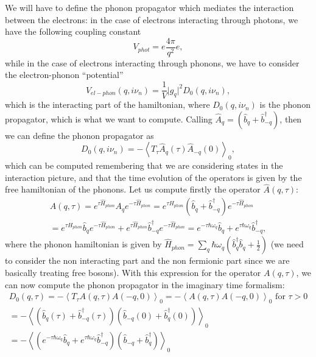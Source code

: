We will have to define the phonon propagator which mediates the interaction between the electrons: in the case of electrons interacting through photons, we have the following coupling constant
\[
    V_{phot} = e \frac{4 \pi}{q^2} e,
\]
while in the case of electrons interacting through phonons, we have to consider the electron-phonon ``potential''
\[
    V_{el-phon} (q, i \nu_n) = \frac{1}{V} \vert g_q \vert^2 D_{0}(q, i \nu_n),
\]
which is the interacting part of the hamiltonian, where \(D_{0}(q, i \nu_n)\) is the phonon propagator, which is what we want to compute. Calling \(\hat{A}_q = (\hat{b}_q + \hat{b}_{-q}^{\dagger})\), then we can define the phonon propagator as
\[
    D_{0} (q, i \nu_n) = - \left\langle T_{\tau} \hat{A}_q(\tau) \hat{A}_{-q}(0) \right\rangle_0,
\]
which can be computed remembering that we are considering states in the interaction picture, and that the time evolution of the operators is given by the free hamiltonian of the phonons. Let us compute firstly the operator \(\hat{A}(q,\tau)\):
\[
    \begin{aligned}
        A(q,\tau) = e^{\tau \hat{H}_{phon}} A_q e^{-\tau \hat{H}_{phon}} = e^{\tau H_{phon}} (\hat{b}_q + \hat{b}_{-q}^{\dagger}) e^{-\tau \hat{H}_{phon}} \\
        = e^{\tau H_{phon}} \hat{b}_q e^{-\tau \hat{H}_{phon}} + e^{\tau \hat{H}_{phon}} \hat{b}_{-q}^{\dagger} e^{-\tau \hat{H}_{phon}} = e^{-\tau \hbar \omega_q} \hat{b}_q + e^{\tau \hbar \omega_q} \hat{b}_{-q}^{\dagger},
    \end{aligned}
\]
where the phonon hamiltonian is given by \(\hat{H}_{phon} = \sum_{q} \hbar \omega_q \left( \hat{b}_q^{\dagger} \hat{b}_q + \frac{1}{2} \right)\) (we need to consider the non interacting part and the non fermionic part since we are basically treating free bosons). With this expression for the operator \(A(q,\tau)\), we can now compute the phonon propagator in the imaginary time formalism:
\[
    \begin{aligned}
        D_0(q, \tau) = - \left\langle T_{\tau} A(q,\tau) A(-q,0) \right\rangle_0 = - \left\langle A(q,\tau) A(-q,0) \right\rangle_0 \text{ for } \tau > 0 \\
        = - \left\langle (\hat{b}_q(\tau) + \hat{b}_{-q}^{\dagger}(\tau)) (\hat{b}_{-q}(0) + \hat{b}_q^{\dagger}(0)) \right\rangle_0                      \\
        = - \left\langle (e^{-\tau \hbar \omega_q} \hat{b}_q + e^{\tau \hbar \omega_q} \hat{b}_{-q}^{\dagger}) (\hat{b}_{-q} + \hat{b}_q^{\dagger}) \right\rangle_0
    \end{aligned}
\]
